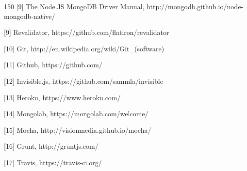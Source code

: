 \documentclass[doc,helv,longtable]{article}
\begin{document}
\begin{thebibliography}{150}
[9] The Node.JS MongoDB Driver Manual, http://mongodb.github.io/node-mongodb-native/

[9] Revalidator, https://github.com/flatiron/revalidator

[10] Git, http://en.wikipedia.org/wiki/Git_(software)

[11] Github, https://github.com/

[12] Invisible.js, https://github.com/sammla/invisible

[13] Heroku, https://www.heroku.com/ 

[14] Mongolab, https://mongolab.com/welcome/

[15] Mocha, http://visionmedia.github.io/mocha/ 

[16] Grunt, http://gruntjs.com/

[17] Travis, https://travis-ci.org/

\end{thebibliography}
\end{document}
